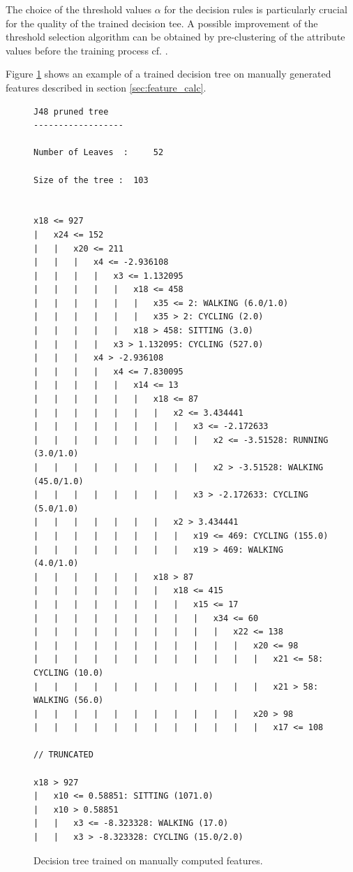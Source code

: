 The choice of the threshold values $\alpha$ for the decision rules is
particularly crucial for the quality of the trained decision tee. A
possible improvement of the threshold selection algorithm can be
obtained by pre-clustering of the attribute values before the
training process cf. \cite{kotsiantis2006}.

Figure \ref{fig:dt_example} shows an example of a trained decision
tree on manually generated features described in section \ref{sec:feature_calc}.

\begin{figure}[h]
\tiny
\centering
\begin{verbatim}
J48 pruned tree
------------------

Number of Leaves  : 	52

Size of the tree : 	103


x18 <= 927
|   x24 <= 152
|   |   x20 <= 211
|   |   |   x4 <= -2.936108
|   |   |   |   x3 <= 1.132095
|   |   |   |   |   x18 <= 458
|   |   |   |   |   |   x35 <= 2: WALKING (6.0/1.0)
|   |   |   |   |   |   x35 > 2: CYCLING (2.0)
|   |   |   |   |   x18 > 458: SITTING (3.0)
|   |   |   |   x3 > 1.132095: CYCLING (527.0)
|   |   |   x4 > -2.936108
|   |   |   |   x4 <= 7.830095
|   |   |   |   |   x14 <= 13
|   |   |   |   |   |   x18 <= 87
|   |   |   |   |   |   |   x2 <= 3.434441
|   |   |   |   |   |   |   |   x3 <= -2.172633
|   |   |   |   |   |   |   |   |   x2 <= -3.51528: RUNNING (3.0/1.0)
|   |   |   |   |   |   |   |   |   x2 > -3.51528: WALKING (45.0/1.0)
|   |   |   |   |   |   |   |   x3 > -2.172633: CYCLING (5.0/1.0)
|   |   |   |   |   |   |   x2 > 3.434441
|   |   |   |   |   |   |   |   x19 <= 469: CYCLING (155.0)
|   |   |   |   |   |   |   |   x19 > 469: WALKING (4.0/1.0)
|   |   |   |   |   |   x18 > 87
|   |   |   |   |   |   |   x18 <= 415
|   |   |   |   |   |   |   |   x15 <= 17
|   |   |   |   |   |   |   |   |   x34 <= 60
|   |   |   |   |   |   |   |   |   |   x22 <= 138
|   |   |   |   |   |   |   |   |   |   |   x20 <= 98
|   |   |   |   |   |   |   |   |   |   |   |   x21 <= 58: CYCLING (10.0)
|   |   |   |   |   |   |   |   |   |   |   |   x21 > 58: WALKING (56.0)
|   |   |   |   |   |   |   |   |   |   |   x20 > 98
|   |   |   |   |   |   |   |   |   |   |   |   x17 <= 108

// TRUNCATED

x18 > 927
|   x10 <= 0.58851: SITTING (1071.0)
|   x10 > 0.58851
|   |   x3 <= -8.323328: WALKING (17.0)
|   |   x3 > -8.323328: CYCLING (15.0/2.0)
\end{verbatim}
\normalsize
\caption{Decision tree trained on manually computed features.}
\label{fig:dt_example}
\end{figure}

